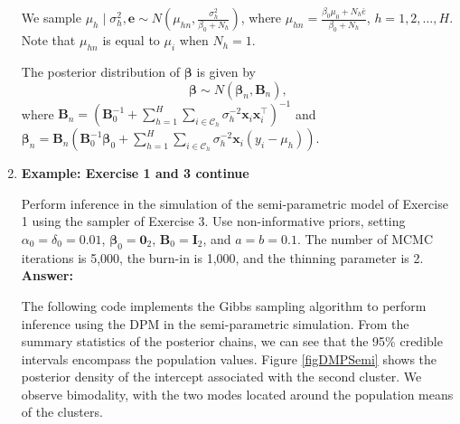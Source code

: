 \begin{enumerate}[leftmargin=*]
We sample $\mu_h\mid \sigma^2_h,\bm{e}\sim N \left(\mu_{hn}, \frac{\sigma_{h}^2}{\beta_0+N_h}\right)$, where $\mu_{hn}=\frac{\beta_0\mu_0+N_h\bar{e}}{\beta_0+N_h}$,
$h=1,2,\dots,H$. Note that $\mu_{hn}$ is equal to $\mu_i$ when $N_h=1$.  

The posterior distribution of $\boldsymbol{\beta}$ is given by 
$$\boldsymbol{\beta}\sim N(\boldsymbol{\beta}_{n},\boldsymbol{B}_{n}),$$ where $\boldsymbol{B}_{n}=(\boldsymbol{B}_{0}^{-1}+\sum_{h=1}^H\sum_{i\in \mathcal{C}_h}\sigma_h^{-2}\boldsymbol{x}_i\boldsymbol{x}_i^{\top})^{-1}$ and $\boldsymbol{\beta}_{n}=\boldsymbol{B}_{n}(\boldsymbol{B}_{0}^{-1}\boldsymbol{\beta}_{0}+\sum_{h=1}^H\sum_{i\in \mathcal{C}_h}\sigma_h^{-2}\boldsymbol{x}_i(y_i-\mu_h))$.

\item  \textbf{Example: Exercise 1 and 3 continue}

Perform inference in the simulation of the semi-parametric model of Exercise 1 using the sampler of Exercise 3. Use non-informative priors, setting $\alpha_{0}=\delta_{0}=0.01$, $\boldsymbol{\beta}_{0}=\boldsymbol{0}_2$, $\boldsymbol{B}_{0}=\boldsymbol{I}_2$, and $a=b=0.1$. The number of MCMC iterations is 5,000, the burn-in is 1,000, and the thinning parameter is 2.\\ 

\textbf{Answer:}

The following code implements the Gibbs sampling algorithm to perform inference using the DPM in the semi-parametric simulation. From the summary statistics of the posterior chains, we can see that the 95\% credible intervals encompass the population values. Figure \ref{figDMPSemi} shows the posterior density of the intercept associated with the second cluster. We observe bimodality, with the two modes located around the population means of the clusters.


\end{enumerate}
